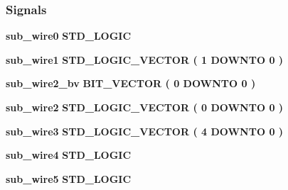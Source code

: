 \subsubsection*{Signals}
 \begin{DoxyCompactItemize}
\item 
{\bf sub\+\_\+wire0} {\bfseries \textcolor{comment}{S\+T\+D\+\_\+\+L\+O\+G\+IC}\textcolor{vhdlchar}{ }} 
\item 
{\bf sub\+\_\+wire1} {\bfseries \textcolor{comment}{S\+T\+D\+\_\+\+L\+O\+G\+I\+C\+\_\+\+V\+E\+C\+T\+OR}\textcolor{vhdlchar}{ }\textcolor{vhdlchar}{(}\textcolor{vhdlchar}{ }\textcolor{vhdlchar}{ } \textcolor{vhdldigit}{1} \textcolor{vhdlchar}{ }\textcolor{keywordflow}{D\+O\+W\+N\+TO}\textcolor{vhdlchar}{ }\textcolor{vhdlchar}{ } \textcolor{vhdldigit}{0} \textcolor{vhdlchar}{ }\textcolor{vhdlchar}{)}\textcolor{vhdlchar}{ }} 
\item 
{\bf sub\+\_\+wire2\+\_\+bv} {\bfseries \textcolor{comment}{B\+I\+T\+\_\+\+V\+E\+C\+T\+OR}\textcolor{vhdlchar}{ }\textcolor{vhdlchar}{(}\textcolor{vhdlchar}{ }\textcolor{vhdlchar}{ } \textcolor{vhdldigit}{0} \textcolor{vhdlchar}{ }\textcolor{keywordflow}{D\+O\+W\+N\+TO}\textcolor{vhdlchar}{ }\textcolor{vhdlchar}{ } \textcolor{vhdldigit}{0} \textcolor{vhdlchar}{ }\textcolor{vhdlchar}{)}\textcolor{vhdlchar}{ }} 
\item 
{\bf sub\+\_\+wire2} {\bfseries \textcolor{comment}{S\+T\+D\+\_\+\+L\+O\+G\+I\+C\+\_\+\+V\+E\+C\+T\+OR}\textcolor{vhdlchar}{ }\textcolor{vhdlchar}{(}\textcolor{vhdlchar}{ }\textcolor{vhdlchar}{ } \textcolor{vhdldigit}{0} \textcolor{vhdlchar}{ }\textcolor{keywordflow}{D\+O\+W\+N\+TO}\textcolor{vhdlchar}{ }\textcolor{vhdlchar}{ } \textcolor{vhdldigit}{0} \textcolor{vhdlchar}{ }\textcolor{vhdlchar}{)}\textcolor{vhdlchar}{ }} 
\item 
{\bf sub\+\_\+wire3} {\bfseries \textcolor{comment}{S\+T\+D\+\_\+\+L\+O\+G\+I\+C\+\_\+\+V\+E\+C\+T\+OR}\textcolor{vhdlchar}{ }\textcolor{vhdlchar}{(}\textcolor{vhdlchar}{ }\textcolor{vhdlchar}{ } \textcolor{vhdldigit}{4} \textcolor{vhdlchar}{ }\textcolor{keywordflow}{D\+O\+W\+N\+TO}\textcolor{vhdlchar}{ }\textcolor{vhdlchar}{ } \textcolor{vhdldigit}{0} \textcolor{vhdlchar}{ }\textcolor{vhdlchar}{)}\textcolor{vhdlchar}{ }} 
\item 
{\bf sub\+\_\+wire4} {\bfseries \textcolor{comment}{S\+T\+D\+\_\+\+L\+O\+G\+IC}\textcolor{vhdlchar}{ }} 
\item 
{\bf sub\+\_\+wire5} {\bfseries \textcolor{comment}{S\+T\+D\+\_\+\+L\+O\+G\+IC}\textcolor{vhdlchar}{ }} 
\item 

\end{DoxyCompactItemize}
